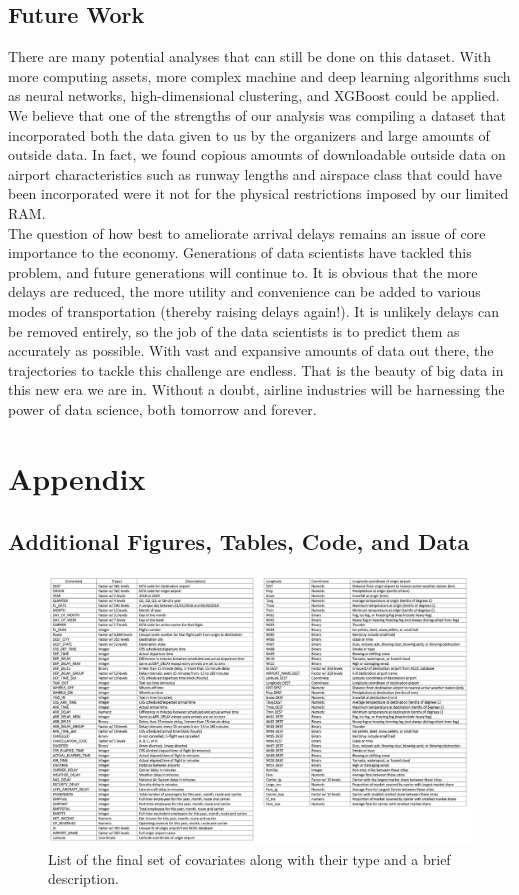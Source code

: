 \documentclass[12pt, a4paper, openany]{book}
\newcommand\tab[1][1cm]{\hspace*{#1}}
\begin{document}
	\section{Future Work}
	\tab There are many potential analyses that can still be done on this dataset. With more computing assets, more complex machine and deep learning algorithms such as neural networks, high-dimensional clustering, and XGBoost could be applied. We believe that one of the strengths of our analysis was compiling a dataset that incorporated both the data given to us by the organizers and large amounts of outside data. In fact, we found copious amounts of downloadable outside data on airport characteristics such as runway lengths and airspace class that could have been incorporated were it not for the physical restrictions imposed by our limited RAM. \\
	\tab The question of how best to ameliorate arrival delays remains an issue of core importance to the economy. Generations of data scientists have tackled this problem, and future generations will continue to. It is obvious that the more delays are reduced, the more utility and convenience can be added to various modes of transportation (thereby raising delays again!). It is unlikely delays can be removed entirely, so the job of the data scientists is to predict them as accurately as possible. With vast and expansive amounts of data out there, the trajectories to tackle this challenge are endless. That is the beauty of big data in this new era we are in. Without a doubt, airline industries will be harnessing the power of data science, both tomorrow and forever.
\chapter{Appendix}
	\section{Additional Figures, Tables, Code, and Data}
			\begin{figure}[h]
			\centering
	 		\includegraphics[width = 1 \textwidth]{../figures/PLOTS FOR REPORT/Covariate List}
	 		\caption{List of the final set of covariates along with their type and a brief description.}
	 		\end{figure}
\end{document}
